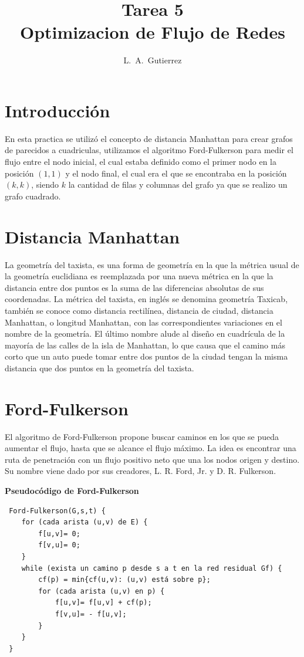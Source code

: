 \documentclass[12pt,letterpaper]{article}
\title{Tarea 5 \\ Optimizacion de Flujo de Redes}
\author{L.\ A.\ Gutierrez}
\begin{document}
\maketitle


\section*{Introducción}
En esta practica se utilizó el concepto de distancia Manhattan\cite{Manhattan} para crear grafos de parecidos a cuadriculas, utilizamos el algoritmo Ford-Fulkerson\cite{Ford-Fulkerson} para medir el flujo entre el nodo inicial, el cual estaba definido como el primer nodo en la posición $(1,1)$ y el nodo final, el cual era el que se encontraba en la posición $(k,k)$, siendo $k$ la cantidad de filas y columnas del grafo ya que se realizo un grafo cuadrado. 


\section*{Distancia Manhattan}
La geometría del taxista, es una forma de geometría en la que la métrica usual de la geometría euclidiana es reemplazada por una nueva métrica en la que la distancia entre dos puntos es la suma de las diferencias absolutas de sus coordenadas. La métrica del taxista, en inglés se denomina geometría Taxicab, también se conoce como distancia rectilínea, distancia de ciudad, distancia Manhattan, o longitud Manhattan, con las correspondientes variaciones en el nombre de la geometría. El último nombre alude al diseño en cuadrícula de la mayoría de las calles de la isla de Manhattan, lo que causa que el camino más corto que un auto puede tomar entre dos puntos de la ciudad tengan la misma distancia que dos puntos en la geometría del taxista.

\section*{Ford-Fulkerson}
El algoritmo de Ford-Fulkerson propone buscar caminos en los que se pueda aumentar el flujo, hasta que se alcance el flujo máximo. La idea es encontrar una ruta de penetración con un flujo positivo neto que una los nodos origen y destino. Su nombre viene dado por sus creadores, L. R. Ford, Jr. y D. R. Fulkerson.

\textbf{Pseudocódigo de Ford-Fulkerson}\cite{Ford-Fulkerson}
\begin{verbatim}
 Ford-Fulkerson(G,s,t) { 
    for (cada arista (u,v) de E) { 
        f[u,v]= 0; 
        f[v,u]= 0; 
    } 
    while (exista un camino p desde s a t en la red residual Gf) { 
        cf(p) = min{cf(u,v): (u,v) está sobre p};
        for (cada arista (u,v) en p) { 
            f[u,v]= f[u,v] + cf(p); 
            f[v,u]= - f[u,v]; 
        }  
    } 
 }
\end{verbatim}
\end{document}
